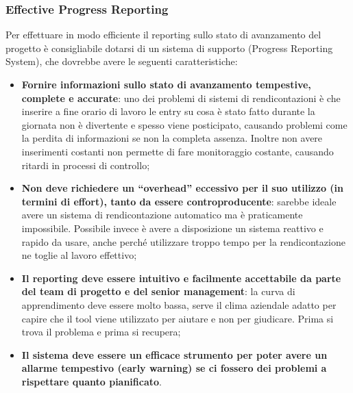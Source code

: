 \subsubsection{Effective Progress Reporting}
Per effettuare in modo efficiente il reporting sullo stato di avanzamento del progetto è consigliabile dotarsi di un sistema di supporto (Progress Reporting System), che dovrebbe avere le seguenti caratteristiche:
\begin{itemize}
	\item \textbf{Fornire informazioni sullo stato di avanzamento tempestive, complete e accurate}: uno dei problemi di sistemi di rendicontazioni è che inserire a fine orario di lavoro le entry su cosa è stato fatto durante la giornata non è divertente e spesso viene posticipato, causando problemi come la perdita di informazioni se non la completa assenza. Inoltre non avere inserimenti costanti non permette di fare monitoraggio costante, causando ritardi in processi di controllo;
	\item \textbf{Non deve richiedere un “overhead” eccessivo per il suo utilizzo (in termini di effort), tanto da essere controproducente}: sarebbe ideale avere un sistema di rendicontazione automatico ma è praticamente impossibile. Possibile invece è avere a disposizione un sistema reattivo e rapido da usare, anche perché utilizzare troppo tempo per la rendicontazione ne toglie al lavoro effettivo;
	\item \textbf{Il reporting deve essere intuitivo e facilmente accettabile da parte del team di progetto e del senior management}: la curva di apprendimento deve essere molto bassa, serve il clima aziendale adatto per capire che il tool viene utilizzato per aiutare e non per giudicare. Prima si trova il problema e prima si recupera;
	\item \textbf{Il sistema deve essere un efficace strumento per poter avere un allarme tempestivo (early warning) se ci fossero dei problemi a rispettare quanto pianificato}.
\end{itemize}
